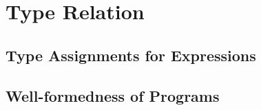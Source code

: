 \section{Type Relation}
\subsection{Type Assignments for Expressions}
\subsection{Well-formedness of Programs}

